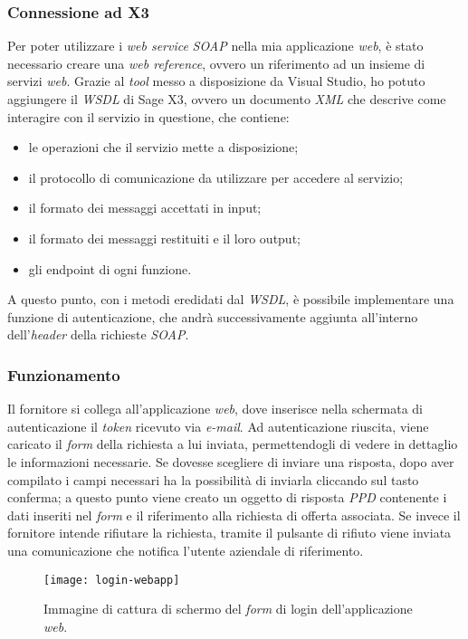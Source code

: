 \subsubsection{Connessione ad X3}
Per poter utilizzare i \textit{web service} \textit{SOAP} nella mia applicazione \textit{web}, è stato necessario creare una \textit{web reference}, ovvero un riferimento ad un insieme di servizi \textit{web}.
Grazie al \textit{tool} messo a disposizione da Visual Studio, ho potuto aggiungere il \textit{WSDL} di Sage X3, ovvero un documento \textit{XML} che descrive come interagire con il servizio in questione, che contiene:
\begin{itemize}
	\item le operazioni che il servizio mette a disposizione;
	\item il protocollo di comunicazione da utilizzare per accedere al servizio;
	\item il formato dei messaggi accettati in input;
	\item il formato dei messaggi restituiti e il loro output;
	\item gli endpoint di ogni funzione.
\end{itemize}
A questo punto, con i metodi eredidati dal \textit{WSDL}, è possibile implementare una funzione di autenticazione, che andrà successivamente aggiunta all'interno dell'\textit{header} della richieste \textit{SOAP}.



\subsubsection{Funzionamento}
Il fornitore si collega all'applicazione \textit{web}, dove inserisce nella schermata di autenticazione il \textit{token} ricevuto via \textit{e-mail}.
Ad autenticazione riuscita, viene caricato il \textit{form} della richiesta a lui inviata, permettendogli di vedere in dettaglio le informazioni necessarie.
Se dovesse scegliere di inviare una risposta, dopo aver compilato i campi necessari ha la possibilità di inviarla cliccando sul tasto conferma; a questo punto viene creato un oggetto di risposta \textit{PPD} contenente i dati inseriti nel \textit{form} e il riferimento alla richiesta di offerta associata.
Se invece il fornitore intende rifiutare la richiesta, tramite il pulsante di rifiuto viene inviata una comunicazione che notifica l'utente aziendale di riferimento.
\begin{figure}[htbp]
	\begin{center}
		\texttt{[image: login-webapp]}
		\caption{Immagine di cattura di schermo del \textit{form} di login dell'applicazione \textit{web}.}
	\end{center}
\end{figure}

